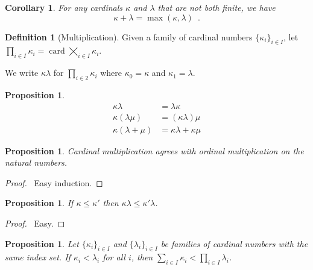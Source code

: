 \documentclass{report}
\let\qed\relax
\newtheorem{prop}[ax]{Proposition}
\newtheorem{cor}{Corollary}[ax]
\theoremstyle{definition}
\newtheorem{df}[ax]{Definition}
\newcommand{\card}{\ensuremath{\operatorname{card}}}
\begin{document}
\begin{cor}
\label{cor:add_card}
For any cardinals $\kappa$ and $\lambda$ that are not both finite, we have
\[ \kappa + \lambda = \max(\kappa, \lambda) \enspace . \]
\end{cor}

\begin{df}[Multiplication]
Given a family of cardinal numbers $\{ \kappa_i \}_{i \in I}$, let $\prod_{i \in I} \kappa_i = \card \bigtimes_{i \in I} \kappa_i$.

We write $\kappa \lambda$ for $\prod_{i \in 2} \kappa_i$ where $\kappa_0 =\kappa$ and $\kappa_1 = \lambda$.
\end{df}

\begin{prop}
\begin{align*}
\kappa \lambda & = \lambda \kappa \\
\kappa (\lambda \mu) & = (\kappa \lambda) \mu \\
\kappa (\lambda + \mu) & = \kappa \lambda + \kappa \mu
\end{align*}
\end{prop}

\begin{prop}
Cardinal multiplication agrees with ordinal multiplication on the natural numbers.
\end{prop}

\begin{proof}
\pf\ Easy induction. \qed
\end{proof}

\begin{prop}
If $\kappa \leq \kappa'$ then $\kappa \lambda \leq \kappa' \lambda$.
\end{prop}

\begin{proof}
\pf\ Easy. \qed
\end{proof}

\begin{prop}
\label{prop:cardinal_inequality}
Let $\{\kappa_i\}_{i \in I}$ and $\{\lambda_i\}_{i \in I}$ be families of cardinal numbers with the same index set. If $\kappa_i < \lambda_i$ for all $i$, then $\sum_{i \in I} \kappa_i < \prod_{i \in I} \lambda_i$.
\end{prop}
\end{document}
